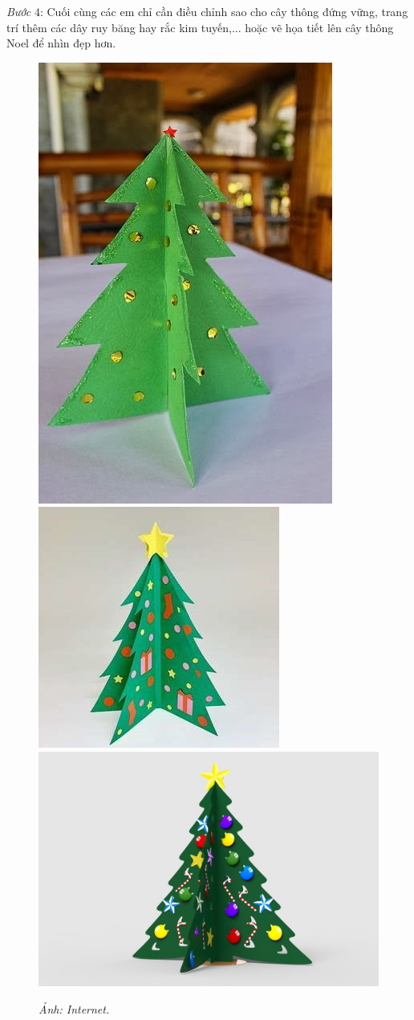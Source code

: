 \begin{multicols}{2}
\begin{figure}[H]
		\vspace*{-15pt}
	\end{figure}
	\textit{Bước} $4$: Cuối cùng các em chỉ cần điều chỉnh sao cho cây thông đứng vững, trang trí thêm các dây ruy băng hay rắc kim tuyến,... hoặc vẽ họa tiết lên cây thông Noel để nhìn đẹp hơn.
	\begin{figure}[H]
		\vspace*{-5pt}
		\centering
		\captionsetup{labelformat= empty, justification=centering}
		\includegraphics[height= 0.31\linewidth]{9a}
		\includegraphics[height= 0.31\linewidth]{9b}
		\includegraphics[height= 0.31\linewidth]{9c}
		\caption{\small\textit{\color{toancuabi}Ảnh: Internet.}}
		\vspace*{-10pt}
	\end{figure}
\end{multicols}
